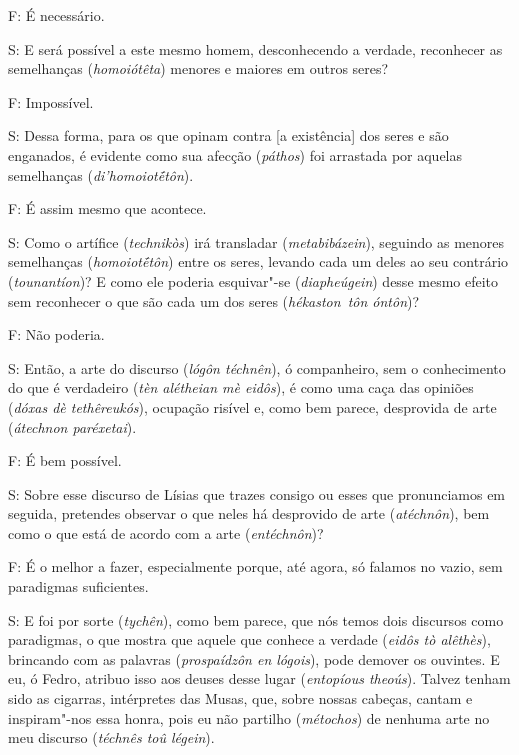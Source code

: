  

F: É necessário.

S: E será possível a este mesmo homem, desconhecendo a verdade,
reconhecer as semelhanças (\emph{homoiótêta}) menores e maiores em
outros seres?

\bekker{[262b]} F: Impossível.

S: Dessa forma, para os que opinam contra [a existência] dos seres e
são enganados, é evidente como sua afecção (\emph{páthos}) foi arrastada
por aquelas semelhanças (\emph{di'homoiotḗtôn}).

F: É assim mesmo que acontece.

S: Como o artífice (\emph{technikòs}) irá transladar
(\emph{metabibázein}), seguindo as menores semelhanças
(\emph{homoiotḗtôn}) entre os seres, levando cada um deles ao seu
contrário (\emph{tounantíon})? E como ele poderia esquivar"-se
(\emph{diapheúgein}) desse mesmo efeito sem reconhecer o que são cada um
dos seres (\emph{hékaston}~\emph{tôn óntôn})?

 

F: Não poderia.

 

\bekker{[262c]} S: Então, a arte do discurso (\emph{lógôn téchnên}), ó
companheiro, sem o conhecimento do que é verdadeiro (\emph{tèn alétheian
mè eidôs}), é como uma caça das opiniões (\emph{dóxas dè tethêreukós}),
ocupação risível e, como bem parece, desprovida de arte (\emph{átechnon
paréxetai}).

 

F: É bem possível.

 

S: Sobre esse discurso de Lísias que trazes consigo ou esses que
pronunciamos em seguida, pretendes observar o que neles há desprovido de
arte (\emph{atéchnôn}), bem como o que está de acordo com a arte
(\emph{entéchnôn})?

 

F: É o melhor a fazer, especialmente porque, até agora, só falamos no
vazio, sem paradigmas suficientes.

 

S: E foi por sorte (\emph{tychên}), como bem parece, que nós temos dois
discursos como paradigmas, o que mostra que aquele que conhece a verdade
(\emph{eidôs tò alêthès}), brincando com as palavras (\emph{prospaídzôn
en lógois}), pode demover os ouvintes. \bekker{[262d]} E eu, ó Fedro, atribuo
isso aos deuses desse lugar (\emph{entopíous theoús}). Talvez tenham
sido as cigarras, intérpretes das Musas, que, sobre nossas cabeças,
cantam e inspiram"-nos essa honra, pois eu não partilho (\emph{métochos})
de nenhuma arte no meu discurso (\emph{téchnês toû légein}).

